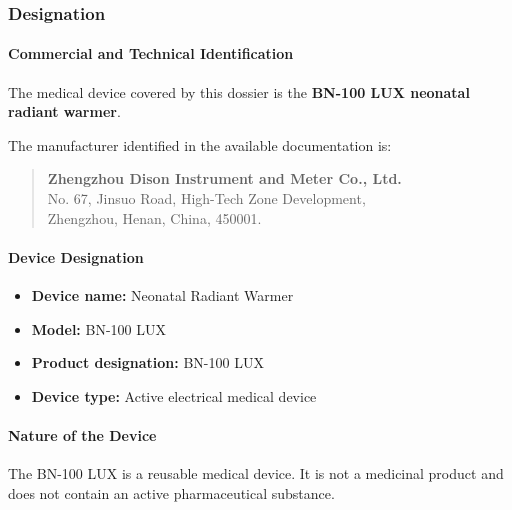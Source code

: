 ﻿
\hypertarget{p3-2-1-1}{}

\subsubsection{Designation}

\paragraph{Commercial and Technical Identification}

The medical device covered by this dossier is the
\textbf{BN-100 LUX neonatal radiant warmer}.

The manufacturer identified in the available documentation is:

\begin{quote}
\textbf{Zhengzhou Dison Instrument and Meter Co., Ltd.}\\
No. 67, Jinsuo Road, High-Tech Zone Development,\\
Zhengzhou, Henan, China, 450001.
\end{quote}

\paragraph{Device Designation}

\begin{itemize}
    \item \textbf{Device name:} Neonatal Radiant Warmer
    \item \textbf{Model:} BN-100 LUX
    \item \textbf{Product designation:} BN-100 LUX
    \item \textbf{Device type:} Active electrical medical device
\end{itemize}

\paragraph{Nature of the Device}

The BN-100 LUX is a reusable medical device. It is not a
medicinal product and does not contain an active pharmaceutical
substance.

